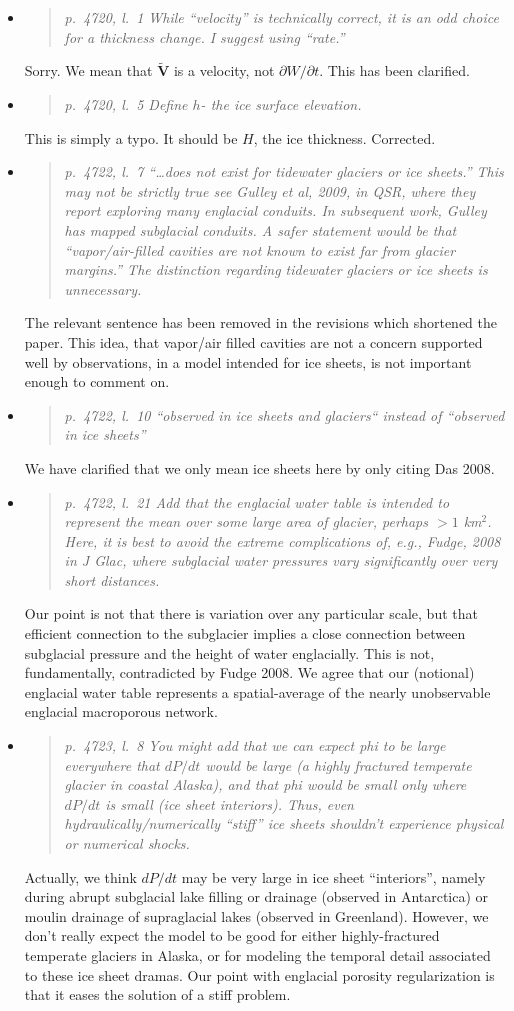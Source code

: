 \documentclass[11pt,reqno]{amsart}
\newcommand{\reply}[2]{
\medskip\medskip
\item  \begin{quote}
\emph{#1}
\end{quote}

\medskip
\noindent #2}
\begin{document}
\begin{itemize}
\reply{p.~4720, l.~1  While ``velocity'' is technically correct, it is an odd choice for a thickness change. I suggest using ``rate.''}
{Sorry.  We mean that $\tilde{\mathbf{V}}$ is a velocity, not $\partial W/\partial t$.  This has been clarified.}

\reply{p.~4720, l.~5 Define $h$- the ice surface elevation.}
{This is simply a typo.  It should be $H$, the ice thickness.  Corrected.}

\reply{p.~4722, l.~7 ``\dots does not exist for tidewater glaciers or ice sheets.'' This may not be strictly true see Gulley et al, 2009, in QSR, where they report exploring many englacial conduits.  In subsequent work, Gulley has mapped subglacial conduits.  A safer statement would be that ``vapor/air-filled cavities are not known to exist far from glacier margins.''  The distinction regarding tidewater glaciers or ice sheets is unnecessary.}
{The relevant sentence has been removed in the revisions which shortened the paper.  This idea, that vapor/air filled cavities are not a concern supported well by observations, in a model intended for ice sheets, is not important enough to comment on.}

\reply{p.~4722, l.~10 ``observed in ice sheets and glaciers`` instead of ``observed in ice sheets''}
{We have clarified that we only mean ice sheets here by only citing Das 2008.}

\reply{p.~4722, l.~21 Add that the englacial water table is intended to represent the mean
over some large area of glacier, perhaps $>1$ km$^2$. Here, it is best to avoid the extreme
complications of, e.g., Fudge, 2008 in J Glac, where subglacial water pressures vary
significantly over very short distances.}
{Our point is not that there is variation over any particular scale, but that efficient connection to the subglacier implies a close connection between subglacial pressure and the height of water englacially.  This is not, fundamentally, contradicted by Fudge 2008.  We agree that our (notional) englacial water table represents a spatial-average of the nearly unobservable englacial macroporous network.}

\reply{p.~4723, l.~8 You might add that we can expect phi to be large everywhere that $dP/dt$ would be large (a highly fractured temperate glacier in coastal Alaska), and that phi would be small only where $dP/dt$ is small (ice sheet interiors). Thus, even hydraulically/numerically ``stiff'' ice sheets shouldn’t experience physical or numerical shocks.}
{Actually, we think $dP/dt$ may be very large in ice sheet ``interiors'', namely during abrupt subglacial lake filling or drainage (observed in Antarctica) or moulin drainage of supraglacial lakes (observed in Greenland).  However, we don't really expect the model to be good for either highly-fractured temperate glaciers in Alaska, or for modeling the temporal detail associated to these ice sheet dramas.  Our point with englacial porosity regularization is that it eases the solution of a stiff problem.}


\end{itemize}
\end{document}
